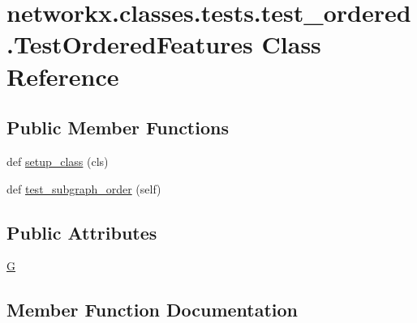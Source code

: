 \hypertarget{classnetworkx_1_1classes_1_1tests_1_1test__ordered_1_1TestOrderedFeatures}{}\section{networkx.\+classes.\+tests.\+test\+\_\+ordered.\+Test\+Ordered\+Features Class Reference}
\label{classnetworkx_1_1classes_1_1tests_1_1test__ordered_1_1TestOrderedFeatures}
\subsection*{Public Member Functions}
\begin{DoxyCompactItemize}
\item 
def \hyperlink{classnetworkx_1_1classes_1_1tests_1_1test__ordered_1_1TestOrderedFeatures_a7b0c96f365ca0d5ba4f0153af1e7b87d}{setup\+\_\+class} (cls)
\item 
def \hyperlink{classnetworkx_1_1classes_1_1tests_1_1test__ordered_1_1TestOrderedFeatures_a46121ae4d7ab9fdeaac7f24e9942ca0c}{test\+\_\+subgraph\+\_\+order} (self)
\end{DoxyCompactItemize}
\subsection*{Public Attributes}
\begin{DoxyCompactItemize}
\item 
\hyperlink{classnetworkx_1_1classes_1_1tests_1_1test__ordered_1_1TestOrderedFeatures_a6b0783f50efc5f729382501c59c91b1b}{G}
\end{DoxyCompactItemize}


\subsection{Member Function Documentation}
\mbox{\label{classnetworkx_1_1classes_1_1tests_1_1test__ordered_1_1TestOrderedFeatures_a7b0c96f365ca0d5ba4f0153af1e7b87d}} 
